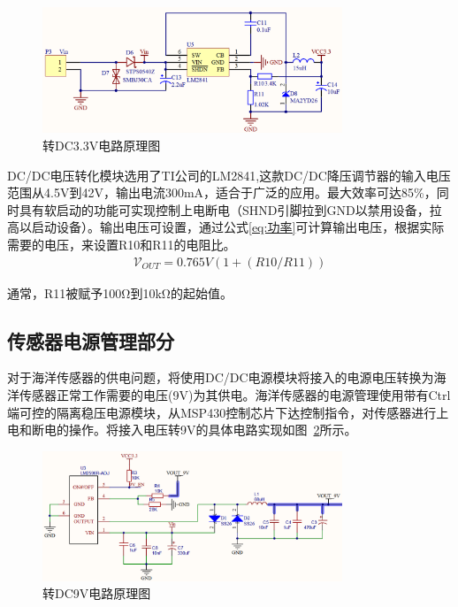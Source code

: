 \begin{figure}[ht]
    \centering
	\includegraphics[width=0.8\textwidth]{fig/DC_3.3.png}
	\caption{转DC3.3V电路原理图}
	\label{fig:DC3.3V}
\end{figure}
                                                
DC/DC电压转化模块选用了TI公司的LM2841,这款DC/DC降压调节器的输入电压范围从4.5V到42V，输出电流300mA，适合于广泛的应用。最大效率可达85\%，同时具有软启动的功能可实现控制上电断电（SHND引脚拉到GND以禁用设备，拉高以启动设备）。输出电压可设置，通过公式\ref{eq:功率}可计算输出电压，根据实际需要的电压，来设置R10和R11的电阻比。
\begin{equation}
\begin{split}
\mathcal{V}_{OUT} = 0.765 V (1 + (R10/ R11))
\end{split}
\label{eq:功率}
\end{equation}   

通常，R11被赋予100Ω到10kΩ的起始值。

\subsection{传感器电源管理部分}
对于海洋传感器的供电问题，将使用DC/DC电源模块将接入的电源电压转换为海洋传感器正常工作需要的电压(9V)为其供电。海洋传感器的电源管理使用带有Ctrl端可控的隔离稳压电源模块，从MSP430控制芯片下达控制指令，对传感器进行上电和断电的操作。将接入电压转9V的具体电路实现如图~\ref{fig:DC9V}所示。

\begin{figure}[ht]
    \centering
	\includegraphics[width=0.8\textwidth]{fig/DC_9V.png}
	\caption{转DC9V电路原理图}
	\label{fig:DC9V}
\end{figure}

